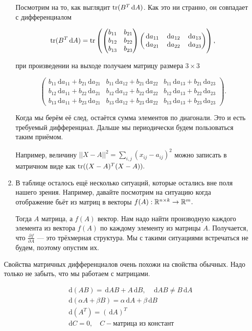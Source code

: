 \documentclass[12pt,fleqn]{article}
\newcommand{\dx}[1]{\,\mathrm{d}#1} %
\begin{document}
\begin{enumerate}
Посмотрим на то, как выглядит $\Tr(B^T \dx{A})$. Как это ни странно, он совпадает с дифференциалом 

\[\Tr(B^T \dx{A}) = \Tr \left( \begin{pmatrix} b_{11} & b_{21} \\ b_{12} & b_{22} \\ b_{13} &  b_{23} \end{pmatrix} \begin{pmatrix} \dx a_{11} & \dx a_{12} & \dx a_{13} \\ \dx a_{21} & \dx a_{22} & \dx a_{23} \end{pmatrix} \right),
\]

при произведении на выходе получаем матрицу размера $3 \times 3$

\[
\begin{pmatrix} b_{11} \dx a_{11} +  b_{21} \dx a_{21} & b_{11} \dx a_{12} +  b_{21} \dx a_{22} & b_{11} \dx a_{13} +  b_{21} \dx a_{23} \\ b_{12} \dx a_{11} +  b_{22} \dx a_{21} & b_{12} \dx a_{12} +  b_{22} \dx a_{22} & b_{12} \dx a_{13} +  b_{22} \dx a_{23} \\ b_{13} \dx a_{11} +  b_{23} \dx a_{21} & b_{13} \dx a_{12} +  b_{23} \dx a_{22} & b_{13} \dx a_{13} +  b_{23} \dx a_{23} \end{pmatrix}.
\]

Когда мы берём её след, остаётся сумма элементов по диагонали. Это и есть требуемый дифференциал. Дальше мы периодически будем пользоваться таким приёмом. 

Например,  величину $||X-A||^2 = \sum_{i,j} (x_{ij} - a_{ij})^2$ можно записать в матричном виде как  $\mathop{\mathrm{tr}}((X-A)^T (X-A)).$

\item В таблице осталось ещё несколько ситуаций, которые остались вне поля нашего зрения.  Например, давайте посмотрим на ситуацию когда отображение бьёт из матриц в векторы $f(A) : \RR^{n \times k} \to \RR^m.$

Тогда $A$ матрица, а $f(A)$ вектор. Нам надо найти производную каждого элемента из вектора $f(A)$ по каждому элементу из матрицы $A$. Получается, что $\frac{\partial f}{\partial A}$ --- это трёхмерная структура. Мы с такими ситуациями встречаться не будем, поэтому опустим их.
\end{enumerate}

Свойства матричных дифференциалов очень похожи на свойства обычных. Надо только не забыть, что мы работаем с матрицами.

\begin{equation*}
    \begin{aligned} 
    & \dx{(AB)} = \dx{A}B + A\dx{B}, \quad \dx{A}B \ne B\dx{A} \\
    & \dx{(\alpha A + \beta B)} = \alpha \dx{A} + \beta \dx{B} \\
    & \dx{(A^T)} = (\dx{A})^T \\
    & \dx{C} = 0, \quad C - \text{матрица из констант}
    \end{aligned} 
\end{equation*}
\end{document}
